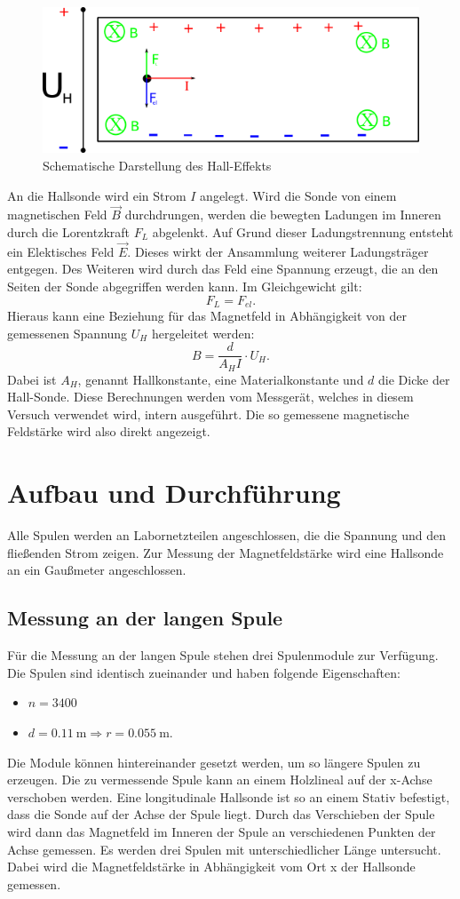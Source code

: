 \documentclass[11pt,ngerman,a4paper]{article}
\begin{document}
\begin{figure}[htp]
\centering
\includegraphics[scale=1.00]{hall.png}
\caption{Schematische Darstellung des Hall-Effekts}
\label{hall}
\end{figure}
\noindent
An die Hallsonde wird ein Strom $I$ angelegt. Wird die Sonde von einem magnetischen Feld $\vec B$ durchdrungen, werden die bewegten Ladungen im Inneren durch die Lorentzkraft $F_L$ abgelenkt. Auf Grund dieser Ladungstrennung entsteht ein Elektisches Feld $\vec E$. Dieses wirkt der Ansammlung weiterer Ladungsträger entgegen. Des Weiteren wird durch das Feld eine Spannung erzeugt, die an den Seiten der Sonde abgegriffen werden kann. Im Gleichgewicht gilt:
\[
F_L = F_{el}.
\]
Hieraus kann eine Beziehung für das Magnetfeld in Abhängigkeit von der gemessenen Spannung $U_H$ hergeleitet werden:
\[
B = \frac{d}{A_H I } \cdot U_H.
\]
Dabei ist $A_H$, genannt Hallkonstante, eine Materialkonstante und $d$ die Dicke der Hall-Sonde. 
Diese Berechnungen werden vom Messgerät, welches in diesem Versuch verwendet wird, intern ausgeführt. Die so gemessene magnetische Feldstärke wird also direkt angezeigt.

\section{Aufbau und Durchführung}
Alle Spulen werden an Labornetzteilen angeschlossen, die die Spannung und den fließenden Strom zeigen. Zur Messung der Magnetfeldstärke wird eine Hallsonde an ein Gaußmeter angeschlossen.
\subsection{Messung an der langen Spule}
Für die Messung an der langen Spule stehen drei Spulenmodule zur Verfügung. Die Spulen sind identisch zueinander und haben folgende Eigenschaften:
\begin{itemize}
\item $n = 3400$
\item $d = \SI{0.11}{\meter} \Rightarrow r =  \SI{0.055}{\meter} $.
\end{itemize}
Die Module können hintereinander gesetzt werden, um so längere Spulen zu erzeugen. Die zu vermessende Spule kann an einem Holzlineal auf der x-Achse verschoben werden. Eine longitudinale Hallsonde ist so an einem Stativ befestigt, dass die Sonde auf der Achse der Spule liegt. Durch das Verschieben der Spule wird dann das Magnetfeld im Inneren der Spule an verschiedenen Punkten der Achse gemessen.
\newline
Es werden drei Spulen mit unterschiedlicher Länge untersucht. Dabei wird die Magnetfeldstärke in Abhängigkeit vom Ort x der Hallsonde gemessen.
\end{document}
